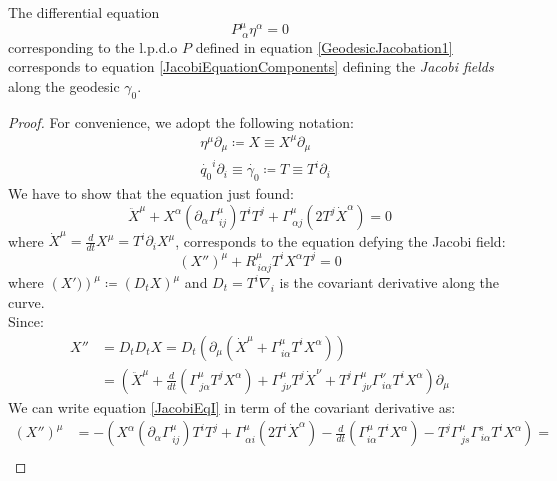 \documentclass[Main]{subfiles}
\begin{document}
	
	\begin{proposition}
		The differential equation $$P^\mu_{\: \alpha} \eta^\alpha=0$$ corresponding to the l.p.d.o $P$ defined in equation \ref{GeodesicJacobation1} corresponds to equation \ref{JacobiEquationComponents} defining  the \emph{Jacobi fields} along the geodesic $\gamma_0$.
	\end{proposition}
	\begin{proof}
		For convenience, we adopt the following notation:
		\begin{align*}
		&\eta^\mu \partial_\mu \coloneqq X \equiv X^\mu \partial_\mu \\
		&\dot{q_0}^i \partial_i \equiv \dot{\gamma_0} \coloneqq T \equiv T^i \partial_i
		\end{align*}
		We have to show that the equation just found:
		\begin{equation}\label{JacobiEqI}
			\ddot{X}^\mu + X^\alpha\left(\partial_\alpha\Gamma^{\mu}_{\, i j}\right)T^i T^j + \Gamma^\mu_{\, \alpha j}\left(2 T^j \dot{X}^\alpha \right) = 0
		\end{equation}
		where $\dot{X}^\mu = \frac{d}{dt}X^\mu= T^i \partial_i X^\mu$,
		corresponds to the equation defying the Jacobi field:
		\begin{equation}\label{JacobiEqII}
			\left(X'' \right)^\mu + R^\mu_{\, i \alpha j}T^i X^\alpha T^j = 0
		\end{equation}
		where $\left(X')\right)^\mu \coloneqq \left(D_t X \right)^\mu$ and $D_t = T^i \nabla_i$ is the covariant derivative along the curve.\\
		Since:
		\begin{align}\label{JacobiEqDerivative}
			X'' &= D_t D_t X = D_t \left( \partial_\mu \left( \dot{X}^\mu + \Gamma^\mu_{\, i \alpha} T^i X^\alpha \right)\right) \nonumber \\
			&=\left( \ddot{X}^\mu + \frac{d}{dt}\left( \Gamma^\mu_{\, j \alpha} T^j X^\alpha \right) + \Gamma^\mu_{\, j \nu}T^j \dot{X}^\nu + T^j \Gamma^\mu_{\, j \nu} \Gamma^\nu_{\, i \alpha} T^i X^\alpha \right)\partial_\mu
		\end{align}
		We can write equation \ref{JacobiEqI} in term of the covariant derivative as:
		\begin{align*}
			\left(X'' \right)^\mu &=
			- \left(
			X^\alpha\left(\partial_\alpha\Gamma^{\mu}_{\, i j}\right)T^i T^j + \Gamma^\mu_{\, \alpha i}\left(2 T^i \dot{X}^\alpha \right)
			- \frac{d}{dt}\left( \Gamma^\mu_{i \alpha} T^i X^\alpha \right) - T^j \Gamma^\mu_{\, j s} \Gamma^s_{\, i \alpha} T^i X^\alpha
			\right) =\\

\end{align*}
\end{proof}
\end{document}
